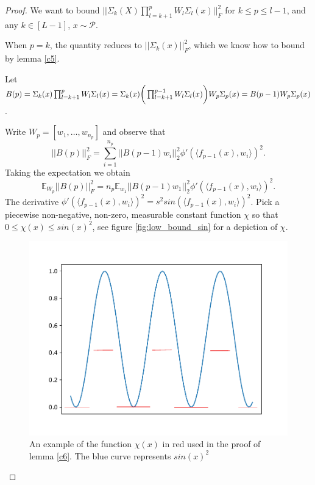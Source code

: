 \documentclass{article}
\theoremstyle{plain}
\theoremstyle{definition}
\theoremstyle{remark}
\begin{document}
\begin{proof}
We want to bound 
$\vert\vert \Sigma_k(X) \prod_{l=k+1}^pW_l\Sigma_l(x)\vert\vert^2_F$ for 
$k \leq p \leq l-1$, and any $k \in [L-1]$, $x \sim \mathcal{P}$.

When $p = k$, the quantity reduces to $\vert\vert \Sigma_k(x)\vert\vert_F^2$, which we know how to bound by lemma \ref{c5}. 

Let $B(p) = \Sigma_{k}(x)\prod_{l=k+1}^pW_l\Sigma_l(x) =
\Sigma_{k}(x)\bigg{(}\prod_{l=k+1}^{p-1}W_l\Sigma_l(x)\bigg{)}W_p\Sigma_p(x) =
B(p-1)W_p\Sigma_p(x)$.

Write $W_p = [w_1,\ldots,w_{n_p}]$ and observe that
\begin{equation*}
\vert\vert B(p)\vert\vert_F^2 = \sum_{i=1}^{n_p}
\vert\vert B(p-1)w_i\vert\vert_2^2\phi'(\langle f_{p-1}(x), w_i\rangle)^2.
\end{equation*}
Taking the expectation we obtain
\begin{equation*}
	\mathbb{E}_{W_p}\vert\vert B(p)\vert\vert_F^2 = 
	n_p\mathbb{E}_{w_1}\vert\vert B(p-1)w_1\vert\vert^2_2
	\phi'(\langle f_{p-1}(x), w_i\rangle)^2.
\end{equation*}
The derivative $\phi'(\langle f_{p-1}(x), w_i\rangle)^2 
= s^2sin(\langle f_{p-1}(x), w_i\rangle)^2$. Pick a piecewise non-negative, non-zero, measurable constant function $\chi$ so that 
$0 \leq \chi(x) \leq sin(x)^2$, see figure \ref{fig:low_bound_sin} for a depiction of $\chi$.

\begin{figure}[t]
\includegraphics[width=1.0\linewidth]{pic_sin_edit.pdf}
\vspace{-1.5cm}
\caption{An example of the function $\chi(x)$ in red used in the proof of lemma \ref{c6}. The blue curve represents $sin(x)^2$}\label{chi_bound_sin}
\end{figure}\label{fig:low_bound_sin}



\end{proof}
\end{document}
